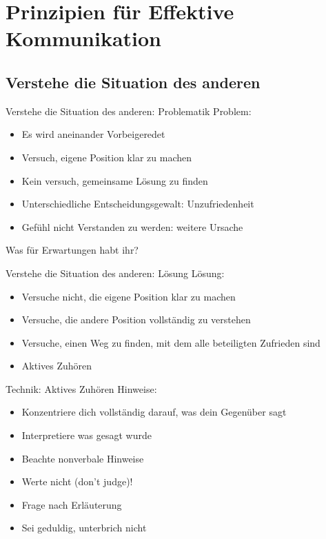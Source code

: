 \section{Prinzipien für Effektive Kommunikation}

\subsection{Verstehe die Situation des anderen}

\begin{frame}[c]{Verstehe die Situation des anderen: Problematik}
    \large
    Problem:
    \begin{itemize}[<+(1)->]
        \item Es wird aneinander Vorbeigeredet
        \item Versuch, eigene Position klar zu machen
        \item Kein versuch, gemeinsame Lösung zu finden
        \item Unterschiedliche Entscheidungsgewalt: Unzufriedenheit
        \item Gefühl nicht Verstanden zu werden: weitere Ursache
    \end{itemize}
\end{frame}

\begin{frame}[c,standout]
    Was für Erwartungen habt ihr?
\end{frame}

\begin{frame}[c]{Verstehe die Situation des anderen: Lösung}
    \large
    Lösung:
    \begin{itemize}[<+(1)->]
        \item Versuche nicht, die eigene Position klar zu machen
        \item Versuche, die andere Position vollständig zu verstehen
        \item Versuche, einen Weg zu finden, mit dem alle beteiligten Zufrieden sind
        \item Aktives Zuhören
    \end{itemize}
\end{frame}


\begin{frame}[c]{Technik: Aktives Zuhören}
    \large
    Hinweise:
    \begin{itemize}[<+(1)->]
        \item Konzentriere dich vollständig darauf, was dein Gegenüber sagt
        \item Interpretiere was gesagt wurde
        \item Beachte nonverbale Hinweise
        \item Werte nicht (don't judge)!
        \item Frage nach Erläuterung
        \item Sei geduldig, unterbrich nicht
    \end{itemize}
\end{frame}


